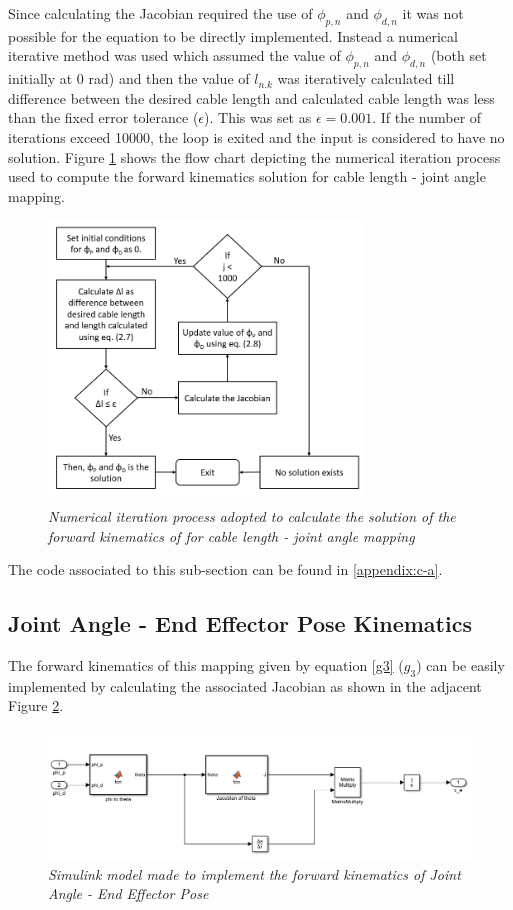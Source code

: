 \documentclass[a4paper,12pt]{report}
\begin{document}
Since calculating the Jacobian required the use of $\phi_{p,n}$ and  $\phi_{d,n}$ it was not possible for the equation to be directly implemented. Instead a numerical iterative method was used which assumed the value of  $\phi_{p,n}$ and  $\phi_{d,n}$ (both set initially at 0 rad) and then the value of $l_{n.k}$ was iteratively calculated till difference between the desired cable length and calculated cable length was less than the fixed error tolerance ($\epsilon$). This was set as $\epsilon=0.001$. If the number of iterations exceed 10000, the loop is exited and the input is considered to have no solution. Figure \ref{fc1} shows the flow chart depicting the numerical iteration process used to compute the forward kinematics solution for cable length - joint angle mapping.
\begin{figure}[H]
	\centering
	\includegraphics[width=0.75\textwidth]{images/Iteration_1.png}
	\caption{\textit{Numerical iteration process adopted to calculate the solution of the forward kinematics of for cable length - joint angle mapping}}
	\label{fc1}
\end{figure}
The code associated to this sub-section can be found in \ref{appendix:c-a}.

\subsection{Joint Angle - End Effector Pose Kinematics}

The forward kinematics of this mapping given by equation \ref{g3} ($g_3$) can be easily implemented by calculating the associated Jacobian as shown in the adjacent Figure \ref{g3-fig}.
\begin{figure}[H]
	\centering
	\includegraphics[width=\textwidth]{images/g3.png}
	\caption{\textit{Simulink model made to implement the forward kinematics of {Joint Angle - End Effector Pose}}}
	\label{g3-fig}
\end{figure}
\end{document}
